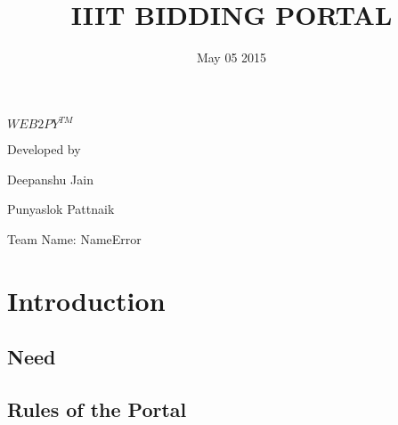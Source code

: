 \documentclass[a4paper,12pt]{article}
\title{ \Huge IIIT BIDDING PORTAL}
\date{ May 05 2015}
\begin{document}
\maketitle

 \newline \newline \newline \newline \newline \newline \newline \newline \newline

\large 

\begin{center}

\textsc{ $WEB2PY^{TM} $}\newpage
\end{center}

\normalsize

\begin{center}
Developed by \\
\end{center}

\begin{center}

Deepanshu Jain \\ 
\end{center}

\begin{center}

Punyaslok Pattnaik \\ 
\end{center}

\begin{center}

Team Name: NameError \newpage
 
\end{center}

\flushleft

\tableofcontents \hfill

\section{Introduction}
\subsection{Need}
\subsection{Rules of the Portal}
\end{document}
